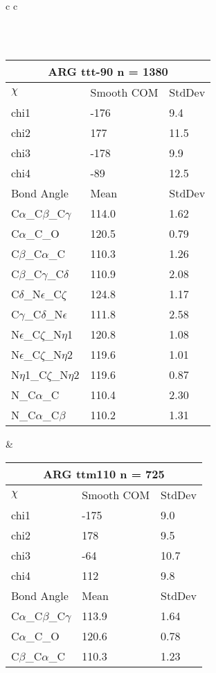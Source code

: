 \begin{longtable}{ c c }
\begin{tabular}{ l l l }
  \end{tabular}
  \\
  \begin{tabular}{ l l l }
  \toprule
  \multicolumn{3}{c}{ARG \textbf{ttt-90} n = 1380} \\ \toprule
  $\chi$       & Smooth COM & StdDev \\ \midrule
  chi1 & -176 & 9.4 \\ 
  chi2 & 177 & 11.5 \\ 
  chi3 & -178 & 9.9 \\ 
  chi4 & -89 & 12.5 \\ \midrule
  Bond Angle   & Mean     & StdDev \\ \midrule
  C$\alpha$\_C$\beta$\_C$\gamma$ & 114.0 & 1.62\\
  C$\alpha$\_C\_O & 120.5 & 0.79\\
  C$\beta$\_C$\alpha$\_C & 110.3 & 1.26\\
  C$\beta$\_C$\gamma$\_C$\delta$ & 110.9 & 2.08\\
  C$\delta$\_N$\epsilon$\_C$\zeta$ & 124.8 & 1.17\\
  C$\gamma$\_C$\delta$\_N$\epsilon$ & 111.8 & 2.58\\
  N$\epsilon$\_C$\zeta$\_N$\eta$1 & 120.8 & 1.08\\
  N$\epsilon$\_C$\zeta$\_N$\eta$2 & 119.6 & 1.01\\
  N$\eta$1\_C$\zeta$\_N$\eta$2 & 119.6 & 0.87\\
  N\_C$\alpha$\_C & 110.4 & 2.30\\
  N\_C$\alpha$\_C$\beta$ & 110.2 & 1.31\\
  \bottomrule
  \end{tabular}
  &
  \begin{tabular}{ l l l }
  \toprule
  \multicolumn{3}{c}{ARG \textbf{ttm110} n = 725} \\ \toprule
  $\chi$       & Smooth COM & StdDev \\ \midrule
  chi1 & -175 & 9.0 \\ 
  chi2 & 178 & 9.5 \\ 
  chi3 & -64 & 10.7 \\ 
  chi4 & 112 & 9.8 \\ \midrule
  Bond Angle   & Mean     & StdDev \\ \midrule
  C$\alpha$\_C$\beta$\_C$\gamma$ & 113.9 & 1.64\\
  C$\alpha$\_C\_O & 120.6 & 0.78\\
  C$\beta$\_C$\alpha$\_C & 110.3 & 1.23\\

\end{tabular}
\end{longtable}
